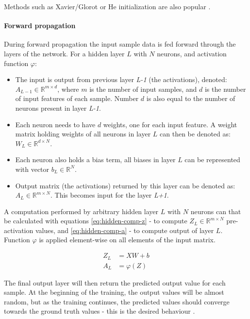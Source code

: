 Methods such as Xavier/Glorot or He initialization are also popular \cite{Abdullahi2023}.

\paragraph{Forward propagation}
During forward propagation the input sample data is fed forward through the layers of the network. For a hidden layer $L$ with $N$ neurons, and activation function $\varphi$:

\begin{itemize}
    \item The input is output from previous layer \textit{L-1} (the activations), denoted: $A_{L-1} \in \mathbb{R}^{m \!\times\! d}$, where $m$ is the number of input samples, and $d$ is the number of input features of each sample. Number $d$ is also equal to the number of neurons present in layer \textit{L-1}.
    \item Each neuron needs to have $d$ weights, one for each input feature. A weight matrix holding weights of all neurons in layer $L$ can then be denoted as: $W_L \in \mathbb{R}^{d \!\times\! N}$.
    \item Each neuron also holds a bias term, all biases in layer $L$ can be represented with vector $b_L \in \mathbb{R}^N$.
    \item Output matrix (the activations) returned by this layer can be denoted as: $A_L \in \mathbb{R}^{m \!\times\! N}$. This becomes input for the layer \textit{L+1}.
\end{itemize}

A computation performed by arbitrary hidden layer $L$ with $N$ neurons can that be calculated with equations \ref{eq:hidden-comp-z} - to compute $Z_L \in \mathbb{R}^{m \!\times\! N}$ pre-activation values, and \ref{eq:hidden-comp-a} - to compute output of layer $L$. Function $\varphi$ is applied element-wise on all elements of the input matrix.

\begin{align}
\label{eq:hidden-comp-z}
Z_L &= XW + b \\
\label{eq:hidden-comp-a}
A_L &= \varphi(Z)
\end{align}



The final output layer will then return the predicted output value for each sample. At the beginning of the training, the output values will be almost random, but as the training continues, the predicted values should converge towards the ground truth values - this is the desired behaviour \cite{Goodfellow2016, LeCun2015}.

